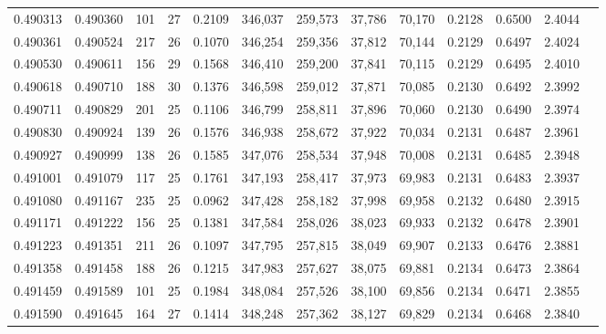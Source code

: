 \begin{tabular}{rrrrrrrrrrrrr}
0.490313 & 0.490360 & 101 &  27 &                                     0.2109 & 346,037 & 259,573 &  37,786 &  70,170 & 0.2128 & 0.6500 & 2.4044 \\
0.490361 & 0.490524 & 217 &  26 &                                     0.1070 & 346,254 & 259,356 &  37,812 &  70,144 & 0.2129 & 0.6497 & 2.4024 \\
0.490530 & 0.490611 & 156 &  29 &                                     0.1568 & 346,410 & 259,200 &  37,841 &  70,115 & 0.2129 & 0.6495 & 2.4010 \\
0.490618 & 0.490710 & 188 &  30 &                                     0.1376 & 346,598 & 259,012 &  37,871 &  70,085 & 0.2130 & 0.6492 & 2.3992 \\
0.490711 & 0.490829 & 201 &  25 &                                     0.1106 & 346,799 & 258,811 &  37,896 &  70,060 & 0.2130 & 0.6490 & 2.3974 \\
0.490830 & 0.490924 & 139 &  26 &                                     0.1576 & 346,938 & 258,672 &  37,922 &  70,034 & 0.2131 & 0.6487 & 2.3961 \\
0.490927 & 0.490999 & 138 &  26 &                                     0.1585 & 347,076 & 258,534 &  37,948 &  70,008 & 0.2131 & 0.6485 & 2.3948 \\
0.491001 & 0.491079 & 117 &  25 &                                     0.1761 & 347,193 & 258,417 &  37,973 &  69,983 & 0.2131 & 0.6483 & 2.3937 \\
0.491080 & 0.491167 & 235 &  25 &                                     0.0962 & 347,428 & 258,182 &  37,998 &  69,958 & 0.2132 & 0.6480 & 2.3915 \\
0.491171 & 0.491222 & 156 &  25 &                                     0.1381 & 347,584 & 258,026 &  38,023 &  69,933 & 0.2132 & 0.6478 & 2.3901 \\
0.491223 & 0.491351 & 211 &  26 &                                     0.1097 & 347,795 & 257,815 &  38,049 &  69,907 & 0.2133 & 0.6476 & 2.3881 \\
0.491358 & 0.491458 & 188 &  26 &                                     0.1215 & 347,983 & 257,627 &  38,075 &  69,881 & 0.2134 & 0.6473 & 2.3864 \\
0.491459 & 0.491589 & 101 &  25 &                                     0.1984 & 348,084 & 257,526 &  38,100 &  69,856 & 0.2134 & 0.6471 & 2.3855 \\
0.491590 & 0.491645 & 164 &  27 &                                     0.1414 & 348,248 & 257,362 &  38,127 &  69,829 & 0.2134 & 0.6468 & 2.3840 \\

\end{tabular}
